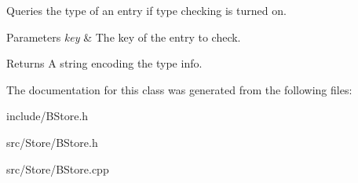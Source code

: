 Queries the type of an entry if type checking is turned on. 


\begin{DoxyParams}{Parameters}
{\em key} & The key of the entry to check. \\
\hline
\end{DoxyParams}
\begin{DoxyReturn}{Returns}
A string encoding the type info. 
\end{DoxyReturn}


The documentation for this class was generated from the following files\-:\begin{DoxyCompactItemize}
\item 
include/B\-Store.\-h\item 
src/\-Store/B\-Store.\-h\item 
src/\-Store/B\-Store.\-cpp\end{DoxyCompactItemize}
